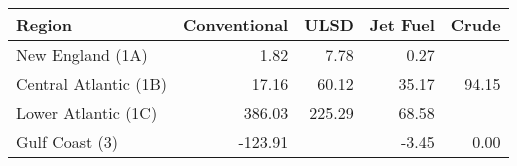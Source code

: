 \begin{tabular}{lrrrr}
  \hline
Region & Conventional & ULSD & Jet Fuel & Crude \\ 
  \hline
New England (1A) & 1.82 & 7.78 & 0.27 &  \\ 
  Central Atlantic (1B) & 17.16 & 60.12 & 35.17 & 94.15 \\ 
  Lower Atlantic (1C) & 386.03 & 225.29 & 68.58 &  \\ 
  Gulf Coast (3) & -123.91 &  & -3.45 & 0.00 \\ 
   \hline
\end{tabular}
